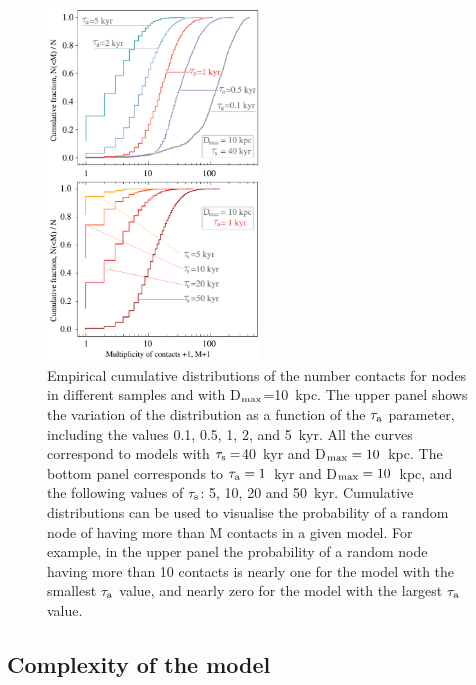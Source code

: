 \documentclass[crop]{CSLB}
\newcommand{\cetis}{nodes}
\begin{document}
 
\begin{figure} \centering
   \includegraphics[width=0.5\textwidth]{F_number_of_contacts.pdf}
   \caption{
Empirical cumulative distributions of the number contacts
   for \cetis{} in different samples and with D$_{\rm max}$=10~kpc.
%
The upper panel shows the variation of the distribution
   as a function of the $\tau_{\rm a}$ parameter, including the values 
   0.1, 0.5, 1, 2, and 5~kyr. All the curves
   correspond to models with 
   $\tau_{\rm s}=$40~kyr and \mbox{D$_{\rm max}=10$~kpc}.
%
   The bottom panel corresponds to 
   $\tau_{\rm a}=1$~kyr and D$_{\rm max}=10$~kpc, and the following values
   of $\tau_{\rm s}$: 5, 10, 20 and 50~kyr.
%
   Cumulative distributions can be used to visualise the probability
   of a random node of having more than M contacts in a given model.  For
   example, in the upper panel the probability of a random node having
   more than 10 contacts is nearly one for the model with the
   smallest $\tau_{\rm a}$ value, and nearly zero for the model with the
   largest $\tau_{\rm a}$ value.
   } \label{F_number_of_contacts}
\end{figure}
        
 

\subsection{Complexity of the model}
\end{document}
